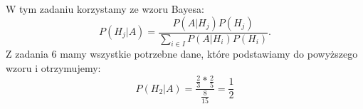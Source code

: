  \medskip
{} 
\medskip

W tym zadaniu korzystamy ze wzoru Bayesa:
$$
P(H_j|A)=\frac{P(A|H_j)P(H_j)}{\sum_{i \in I} P(A|H_i)P(H_i) }.
$$
Z zadania 6 mamy wszystkie potrzebne dane, które podstawiamy do powyższego wzoru i otrzymujemy:
$$
P(H_2|A) = \frac{\frac{2}{3}*\frac{2}{5}}{\frac{8}{15}} = \frac{1}{2}
$$
